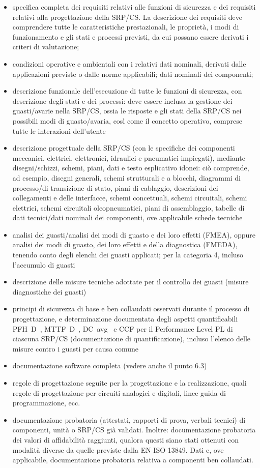 \begin{itemize}
    \item specifica completa dei requisiti relativi alle funzioni di sicurezza e dei requisiti relativi alla progettazione della SRP/CS. La descrizione dei requisiti deve comprendere tutte le caratteristiche prestazionali, le proprietà, i modi di funzionamento e gli stati e processi previsti, da cui possano essere derivati i criteri di valutazione;
    \item condizioni operative e ambientali con i relativi dati nominali, derivati dalle applicazioni previste o dalle norme applicabili; dati nominali dei componenti;
    \item descrizione funzionale dell'esecuzione di tutte le funzioni di sicurezza, con descrizione degli stati e dei processi: deve essere inclusa la gestione dei guasti/avarie nella SRP/CS, ossia le risposte e gli stati della SRP/CS nei possibili modi di guasto/avaria, così come il concetto operativo, comprese tutte le interazioni dell'utente
    \item descrizione progettuale della SRP/CS (con le specifiche dei componenti meccanici, elettrici, elettronici, idraulici e pneumatici impiegati), mediante disegni/schizzi, schemi, piani, dati e testo esplicativo idonei: ciò comprende, ad esempio, disegni generali, schemi strutturali e a blocchi, diagrammi di processo/di transizione di stato, piani di cablaggio, descrizioni dei collegamenti e delle interfacce, schemi concettuali, schemi circuitali, schemi elettrici, schemi circuitali oleopneumatici, piani di assemblaggio, tabelle di dati tecnici/dati nominali dei componenti, ove applicabile schede tecniche
    \item analisi dei guasti/analisi dei modi di guasto e dei loro effetti (FMEA), oppure analisi dei modi di guasto, dei loro effetti e della diagnostica (FMEDA), tenendo conto degli elenchi dei guasti applicati; per la categoria 4, incluso l'accumulo di guasti
    \item descrizione delle misure tecniche adottate per il controllo dei guasti (misure diagnostiche dei guasti)
    \item principi di sicurezza di base e ben collaudati osservati durante il processo di progettazione, e determinazione documentata degli aspetti quantificabili PFH~D~, MTTF~D~, DC~avg~ e CCF per il Performance Level PL di ciascuna SRP/CS (documentazione di quantificazione), incluso l'elenco delle misure contro i guasti per causa comune
    \item documentazione software completa (vedere anche il punto 6.3)
    \item regole di progettazione seguite per la progettazione e la realizzazione, quali regole di progettazione per circuiti analogici e digitali, linee guida di programmazione, ecc.
    \item documentazione probatoria (attestati, rapporti di prova, verbali tecnici) di componenti, unità o SRP/CS già validati. Inoltre: documentazione probatoria dei valori di affidabilità raggiunti, qualora questi siano stati ottenuti con modalità diverse da quelle previste dalla EN ISO 13849. Dati e, ove applicabile, documentazione probatoria relativa a componenti ben collaudati.
\end{itemize}

